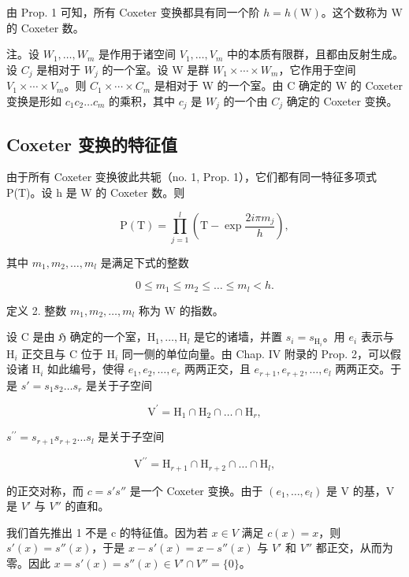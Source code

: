 由 Prop. 1 可知，所有 Coxeter 变换都具有同一个阶 \(h = h(\mathrm{W})\)。这个数称为 W 的 Coxeter 数。

注。设 \(W_{1},\ldots,W_{m}\) 是作用于诸空间 \(V_{1},\ldots,V_{m}\) 中的本质有限群，且都由反射生成。设 \(C_{j}\) 是相对于 \(W_{j}\) 的一个室。设 W 是群 \(W_{1}\times\cdots\times W_{m}\)，它作用于空间 \(V_{1}\times\cdots\times V_{m}\)。则 \(C_{1}\times\cdots\times C_{m}\) 是相对于 W 的一个室。由 C 确定的 W 的 Coxeter 变换是形如 \(c_{1}c_{2}\ldots c_{m}\) 的乘积，其中 \(c_{j}\) 是 \(W_{j}\) 的一个由 \(C_{j}\) 确定的 Coxeter 变换。

\subsection{Coxeter 变换的特征值}

由于所有 Coxeter 变换彼此共轭（no. 1, Prop. 1），它们都有同一特征多项式 P(T)。设 h 是 W 的 Coxeter 数。则

\[
\mathrm{P} (\mathrm{T}) = \prod_ {j = 1} ^ {l} \left(\mathrm{T} - \exp \frac {2 i \pi m _ {j}}{h}\right),
\]

其中 \(m_{1}, m_{2}, \ldots, m_{l}\) 是满足下式的整数

\[
0 \leqslant m _ {1} \leqslant m _ {2} \leqslant \dots \leqslant m _ {l} <   h.
\]

定义 2. 整数 \(m_1, m_2, \ldots, m_l\) 称为 W 的指数。

设 C 是由 \(\mathfrak{H}\) 确定的一个室，\(\mathrm{H}_1, \ldots, \mathrm{H}_l\) 是它的诸墙，并置 \(s_i = s_{\mathrm{H}_i}\)。用 \(e_i\) 表示与 \(\mathrm{H}_i\) 正交且与 C 位于 \(\mathrm{H}_i\) 同一侧的单位向量。由 Chap. IV 附录的 Prop. 2，可以假设诸 \(\mathrm{H}_i\) 如此编号，使得 \(e_1, e_2, \ldots, e_r\) 两两正交，且 \(e_{r+1}, e_{r+2}, \ldots, e_l\) 两两正交。于是 \(s' = s_1 s_2 \ldots s_r\) 是关于子空间

\[
\mathrm{V} ^ {\prime} = \mathrm{H} _ {1} \cap \mathrm{H} _ {2} \cap \dots \cap \mathrm{H} _ {r},
\]

\(s^{\prime \prime} = s_{r + 1}s_{r + 2}\dots s_{l}\) 是关于子空间

\[
\mathrm{V} ^ {\prime \prime} = \mathrm{H} _ {r + 1} \cap \mathrm{H} _ {r + 2} \cap \dots \cap \mathrm{H} _ {l},
\]

的正交对称，而 \(c = s's''\) 是一个 Coxeter 变换。由于 \((e_{1}, \ldots, e_{l})\) 是 V 的基，V 是 \(V'\) 与 \(V''\) 的直和。

我们首先推出 1 不是 c 的特征值。因为若 \(x \in V\) 满足 \(c(x) = x\)，则 \(s'(x) = s''(x)\)，于是 \(x - s'(x) = x - s''(x)\) 与 \(V'\) 和 \(V''\) 都正交，从而为零。因此 \(x = s'(x) = s''(x) \in V' \cap V'' = \{0\}\)。

